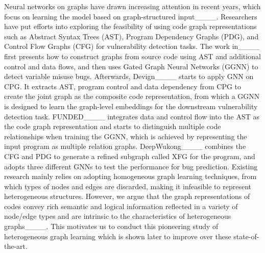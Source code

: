 Neural networks on graphs have drawn increasing attention in recent years, 
which focus on learning the model based on graph-structured input____. 
Researchers have put efforts into exploring the feasibility of using code graph representations such as 
Abstract Syntax Trees (AST), Program Dependency Graphs (PDG), and Control Flow Graphs (CFG) for vulnerability detection tasks. 
The work in____ first presents how to construct graphs from source code using AST and additional control and data flows, 
and then uses Gated Graph Neural Networks (GGNN) to detect variable misuse bugs. 
Afterwards, Devign____ starts to apply GNN on CPG. It extracts AST, 
program control and data dependency from CPG to create the joint graph as the composite code representation, 
from which a GGNN is designed to learn the graph-level embeddings for the downstream vulnerability detection task. 
%
FUNDED____ integrates data and control flow into the AST 
as the code graph representation and starts to distinguish multiple code relationships when training the GGNN, 
which is achieved by representing the input program as multiple relation graphs. 
%
DeepWukong____ combines the CFG and PDG to generate a refined subgraph called XFG for the program, 
and adopts three different GNNs to test the performance for bug prediction. 
Existing research mainly relies on adopting homogeneous graph learning techniques, 
from which types of nodes and edges are discarded, making it infeasible to represent heterogeneous structures. 
However, we argue that the graph representations of codes convey rich semantic and logical information reflected 
in a variety of node/edge types and are intrinsic to the characteristics of heterogeneous graphs____. 
This motivates us to conduct this pioneering study of heterogeneous graph learning which is shown later to improve over these state-of-the-art.